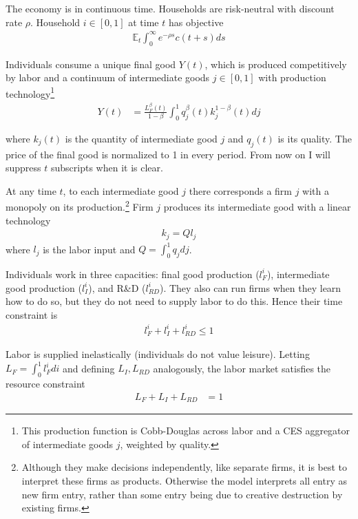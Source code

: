 \documentclass[12pt,english]{article}
\theoremstyle{remark}
\begin{document}
The economy is in continuous time. Households are risk-neutral with discount rate $\rho$. Household $i \in [0,1]$ at time $t$ has objective
\begin{align*}
 \mathbb{E}_t \int_0^{\infty} e^{-\rho s} c(t+s) ds
\end{align*}

Individuals consume a unique final good $Y(t)$, which is produced competitively by labor and a continuum of intermediate goods $j \in [0,1]$ with production technology\footnote{This production function is Cobb-Douglas across labor and a CES aggregator of intermediate goods $j$, weighted by quality. }
\begin{align*}
Y(t) &= \frac{L_F^{\beta}(t)}{1-\beta} \int_0^1 q_j^{\beta}(t) k_j^{1-\beta} (t) dj
\end{align*}

where $k_j(t)$ is the quantity of intermediate good $j$ and $q_j(t)$ is its quality. The price of the final good is normalized to 1 in every period. From now on I will suppress $t$ subscripts when it is clear. 

At any time $t$, to each intermediate good $j$ there corresponds a firm $j$ with a monopoly on its production.\footnote{Although they make decisions independently, like separate firms, it is best to interpret these firms as products. Otherwise the model interprets all entry as new firm entry, rather than some entry being due to creative destruction by existing firms.} Firm $j$ produces its intermediate good with a linear technology
\begin{align*}
k_j = Q l_j
\end{align*}
where $l_j$ is the labor input and $Q = \int_0^1 q_j dj$.

Individuals work in three capacities: final good production ($l_F^i$), intermediate good production ($l_I^i$), and R\&D ($l_{RD}^i$). They also can run firms when they learn how to do so, but they do not need to supply labor to do this. Hence their time constraint is
\begin{align*}
	l_F^i + l_I^i + l_{RD}^i \le 1
\end{align*}

Labor is supplied inelastically (individuals do not value leisure). Letting $L_F = \int_0^1 l_F^i di$ and defining $L_I,L_{RD}$ analogously, the labor market satisfies the resource constraint
\begin{align}
L_F + L_I + L_{RD} &= 1 \label{labor_resource_constraint}
\end{align}
\end{document}
